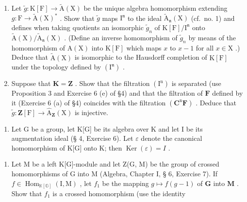 \begin{enumerate}
\def\labelenumi{(\alph{enumi})}
\item
  Let \(\tilde{g}\colon \mathrm{K}[\mathrm{F}] \to \tilde{\mathrm{A}}(\mathrm{X})\) be the unique algebra homomorphism extending \(g\colon \mathrm{F} \to \tilde{\mathrm{A}}(\mathrm{X})^*\) . Show that \(\tilde{g}\) maps \(\mathrm{I}^{\mathfrak{n}}\) to the ideal \(\tilde{\mathrm{A}}_{\mathfrak{n}}(\mathrm{X})\) (cf.~no. 1) and defines when taking quotients an isomorphic \(\tilde{g}_{n}\) of \(\mathrm{K}[\mathrm{F}]/\mathrm{I}^{\mathfrak{n}}\) onto \(\tilde{\mathrm{A}}(\mathrm{X})/\tilde{\mathrm{A}}_{\mathfrak{n}}(\mathrm{X})\) . (Define an inverse homomorphism of \(\tilde{g}_{n}\) by means of the homomorphism of \(\mathrm{A}(\mathrm{X})\) into \(\mathrm{K}[\mathrm{F}]\) which maps \(x\) to \(x - 1\) for all \(x \in \mathrm{X}\) .) Deduce that \(\tilde{\mathrm{A}}(\mathrm{X})\) is isomorphic to the Hausdorff completion of \(\mathrm{K}[\mathrm{F}]\) under the topology defined by \((\mathrm{I}^{\mathfrak{n}})\) .
\item
  Suppose that \(\mathbf{K} = \mathbf{Z}\) . Show that the filtration \((\mathrm{I}^{\mathrm{n}})\) is separated (use Proposition 3 and Exercise 6 (e) of §4) and that the filtration of \(\mathbf{F}\) defined by it (Exercise 6 (a) of §4) coincides with the filtration \((\mathbf{C}^{\mathrm{n}}\mathbf{F})\) . Deduce that \(\tilde{g}\colon \mathbf{Z}[\mathrm{F}] \to \hat{\mathrm{A}}_{\mathbf{Z}}(\mathrm{X})\) is injective.
\end{enumerate}

\begin{enumerate}
\def\labelenumi{\arabic{enumi}.}
\setcounter{enumi}{1}
\tightlist
\item
  Let G be a group, let K{[}G{]} be its algebra over K and let I be its augmentation ideal (§ 4, Exercise 6). Let \(\varepsilon\) denote the canonical homomorphism of K{[}G{]} onto K; then \(\operatorname{Ker}(\varepsilon) = I\) .
\end{enumerate}

\begin{enumerate}
\def\labelenumi{(\alph{enumi})}
\tightlist
\item
  Let M be a left K{[}G{]}-module and let Z(G, M) be the group of crossed homomorphisms of G into M (Algebra, Chapter I, § 6, Exercise 7). If \(f \in \operatorname{Hom}_{\mathbb{K}[\mathbb{G}]}(\mathrm{I}, \mathrm{M})\) , let \(f_1\) be the mapping \(g \mapsto f(g - 1)\) of \(\mathbf{G}\) into \(\mathbf{M}\) . Show that \(f_1\) is a crossed homomorphism (use the identity
\end{enumerate}

